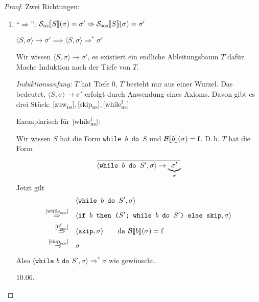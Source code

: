 \begin{proof}
    Zwei Richtungen:
    \begin{enumerate}
        \item ``$\Rightarrow$'': $\mathcal{S_{\text{ns}}}\lsem S \rsem(\sigma) = \sigma' \Rightarrow \mathcal{S_{\text{sos}}}\lsem S \rsem(\sigma) = \sigma'$

            \dh{} $\langle S, \sigma \rangle \to \sigma' \implies \langle S, \sigma \rangle \Rightarrow^* \sigma'$

            Wir wissen $\langle S, \sigma \rangle \to \sigma'$, \dh{} es existiert ein endliche Ableitungsbaum $T$ dafür. Mache Induktion nach der Tiefe von $T$.

            \par\medskip
            \emph{Induktionsanfang:} $T$ hat Tiefe 0, \dh{} $T$ besteht nur aus einer Wurzel. Das bedeutet, $\langle S, \sigma \rangle \to \sigma'$ erfolgt durch Anwendung eines Axioms. Davon gibt es drei Stück: $\infruleNs{zuw}, \infruleNs{skip}, \infruleNs[\false]{while}$

            Exemplarisch für $\infruleNs[\false]{while}$:

            Wir wissen $S$ hat die Form \texttt{while $b$ do $S$} und $\Bsem{b}(\sigma) = \false$. D.\,h. $T$ hat die Form
            \[
                \frac{}{
                    \strans{\texttt{while $b$ do $S'$}}{\sigma}{\underbrace{\sigma'}_{\sigma}}
                }
            \]
            Jetzt gilt
            \begin{align*}
                & \langle \texttt{while $b$ do $S'$}, \sigma \rangle \\
                \overset{\infruleSos{while}}{\Rightarrow} \quad & \langle \texttt{if $b$ then ($S'$; while $b$ do $S'$) else skip} , \sigma \rangle \\
                \overset{\infruleSos[\false]{if}}{\Rightarrow} \quad & \langle \texttt{skip}, \sigma \rangle \quad\quad \text{da } \Bsem{b}(\sigma) = \false \\
                \overset{\infruleSos{skip}}{\Rightarrow} \quad & \sigma \\
            \end{align*}
            Also $\langle \texttt{while $b$ do $S'$}, \sigma \rangle \Rightarrow^* \sigma$ wie gewünscht.

\newpage
\hfill 10.06.


\end{enumerate}
\end{proof}
